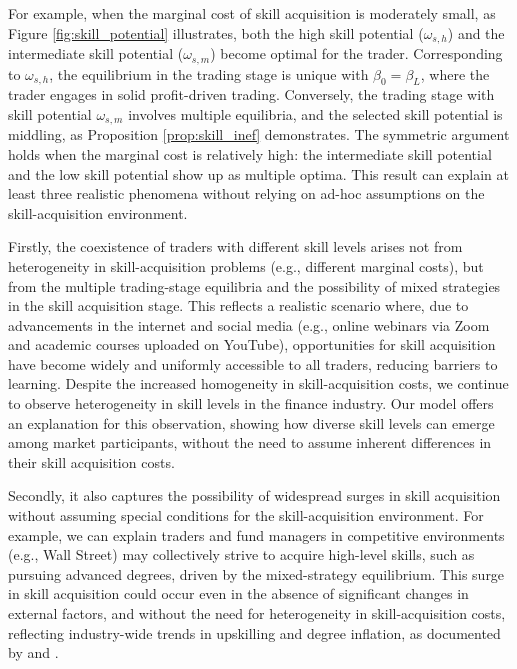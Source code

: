 For example, when the marginal cost of skill acquisition is moderately small, as Figure \ref{fig:skill_potential} illustrates, both the high skill potential ($\omega_{s,h}$) and the intermediate skill potential ($\omega_{s,m}$) become optimal for the trader. Corresponding to $\omega_{s,h}$, the equilibrium in the trading stage is unique with $\beta_{0}=\beta_{L}$, where the trader engages in solid profit-driven trading. Conversely, the trading stage with skill potential $\omega_{s,m}$ involves multiple equilibria, and the selected skill potential is middling, as Proposition \ref{prop:skill_inef} demonstrates. The symmetric argument holds when the marginal cost is relatively high: the intermediate skill potential and the low skill potential show up as multiple optima. This result can explain at least three realistic phenomena without relying on ad-hoc assumptions on the skill-acquisition environment.

Firstly, the coexistence of traders with different skill levels arises not from heterogeneity in skill-acquisition problems (e.g., different marginal costs), but from the multiple trading-stage equilibria and the possibility of mixed strategies in the skill acquisition stage. This reflects a realistic scenario where, due to advancements in the internet and social media (e.g., online webinars via Zoom and academic courses uploaded on YouTube), opportunities for skill acquisition have become widely and uniformly accessible to all traders, reducing barriers to learning. Despite the increased homogeneity in skill-acquisition costs, we continue to observe heterogeneity in skill levels in the finance industry. Our model offers an explanation for this observation, showing how diverse skill levels can emerge among market participants, without the need to assume inherent differences in their skill acquisition costs.

Secondly, it also captures the possibility of widespread surges in skill acquisition without assuming special conditions for the skill-acquisition environment. For example, we can explain traders and fund managers in competitive environments (e.g., Wall Street) may collectively strive to acquire high-level skills, such as pursuing advanced degrees, driven by the mixed-strategy equilibrium. This surge in skill acquisition could occur even in the absence of significant changes in external factors, and without the need for heterogeneity in skill-acquisition costs, reflecting industry-wide trends in upskilling and degree inflation, as documented by \citet{philippon2012wages} and \citet{fuller2017dismiss}.

